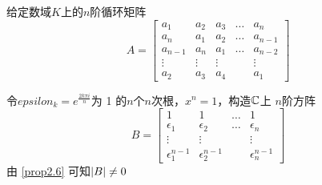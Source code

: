 \documentclass[11pt]{article}
\begin{document}
\begin{examplle}[]
给定数域\(K\)上的\(n\)阶循环矩阵
\begin{equation*}
A=
\begin{bmatrix}
a_1&a_2&a_3&\dots&a_n\\
a_n&a_1&a_2&\dots&a_{n-1}\\
a_{n-1}&a_n&a_1&\dots&a_{n-2}\\
\vdots&\vdots&\vdots&&\vdots\\
a_2&a_3&a_4&&a_1
\end{bmatrix}
\end{equation*}

令\(epsilon_k=e^{\frac{2k\pi i}{n}}\)为 1 的\(n\)个\(n\)次根，\(x^n=1\)，构造\(\mathbb{C}\)上
\(n\)阶方阵
\begin{equation*}
B=
\begin{bmatrix}
1&1&\dots&1\\
\epsilon_1&\epsilon_2&\dots&\epsilon_n\\
\vdots&\vdots&&\vdots\\
\epsilon_1^{n-1}&\epsilon_2^{n-1}&&
\epsilon_n^{n-1}
\end{bmatrix}
\end{equation*}
由 \ref{prop2.6} 可知\(\abs{B}\neq0\)


\end{examplle}
\end{document}

